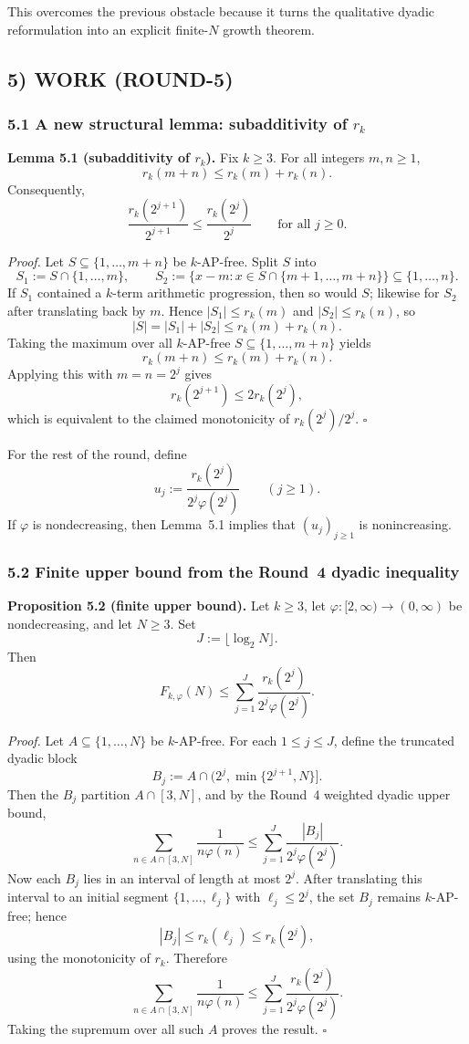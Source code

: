 This overcomes the previous obstacle because it turns the qualitative dyadic reformulation into an explicit finite-$N$ growth theorem.

\subsection{5) WORK (ROUND-5)}

\subsubsection{5.1 A new structural lemma: subadditivity of $r_k$}

\noindent\textbf{Lemma 5.1 (subadditivity of $r_k$).}
Fix $k\ge 3$. For all integers $m,n\ge 1$,
\[
r_k(m+n)\le r_k(m)+r_k(n).
\]
Consequently,
\[
\frac{r_k(2^{j+1})}{2^{j+1}}\le \frac{r_k(2^j)}{2^j}
\qquad\text{for all }j\ge 0.
\]

\noindent\emph{Proof.}
Let $S\subseteq\{1,\dots,m+n\}$ be $k$-AP-free. Split $S$ into
\[
S_1:=S\cap\{1,\dots,m\},
\qquad
S_2:=\{x-m:x\in S\cap\{m+1,\dots,m+n\}\}\subseteq\{1,\dots,n\}.
\]
If $S_1$ contained a $k$-term arithmetic progression, then so would $S$; likewise for $S_2$ after translating back by $m$. Hence $|S_1|\le r_k(m)$ and $|S_2|\le r_k(n)$, so
\[
|S|=|S_1|+|S_2|\le r_k(m)+r_k(n).
\]
Taking the maximum over all $k$-AP-free $S\subseteq\{1,\dots,m+n\}$ yields
\[
r_k(m+n)\le r_k(m)+r_k(n).
\]
Applying this with $m=n=2^j$ gives
\[
r_k(2^{j+1})\le 2r_k(2^j),
\]
which is equivalent to the claimed monotonicity of $r_k(2^j)/2^j$.
\hfill$\square$

\medskip
For the rest of the round, define
\[
u_j:=\frac{r_k(2^j)}{2^j\varphi(2^j)}\qquad (j\ge 1).
\]
If $\varphi$ is nondecreasing, then Lemma~5.1 implies that $(u_j)_{j\ge 1}$ is nonincreasing.

\subsubsection{5.2 Finite upper bound from the Round~4 dyadic inequality}

\noindent\textbf{Proposition 5.2 (finite upper bound).}
Let $k\ge 3$, let $\varphi:[2,\infty)\to(0,\infty)$ be nondecreasing, and let $N\ge 3$. Set
\[
J:=\lfloor \log_2 N\rfloor.
\]
Then
\[
F_{k,\varphi}(N)
\le
\sum_{j=1}^{J} \frac{r_k(2^j)}{2^j\varphi(2^j)}.
\]

\noindent\emph{Proof.}
Let $A\subseteq\{1,\dots,N\}$ be $k$-AP-free. For each $1\le j\le J$, define the truncated dyadic block
\[
B_j:=A\cap (2^j,\min\{2^{j+1},N\}].
\]
Then the $B_j$ partition $A\cap[3,N]$, and by the Round~4 weighted dyadic upper bound,
\[
\sum_{n\in A\cap[3,N]}\frac{1}{n\varphi(n)}
\le
\sum_{j=1}^{J}\frac{|B_j|}{2^j\varphi(2^j)}.
\]
Now each $B_j$ lies in an interval of length at most $2^j$. After translating this interval to an initial segment $\{1,\dots,\ell_j\}$ with $\ell_j\le 2^j$, the set $B_j$ remains $k$-AP-free; hence
\[
|B_j|\le r_k(\ell_j)\le r_k(2^j),
\]
using the monotonicity of $r_k$. Therefore
\[
\sum_{n\in A\cap[3,N]}\frac{1}{n\varphi(n)}
\le
\sum_{j=1}^{J}\frac{r_k(2^j)}{2^j\varphi(2^j)}.
\]
Taking the supremum over all such $A$ proves the result.
\hfill$\square$

